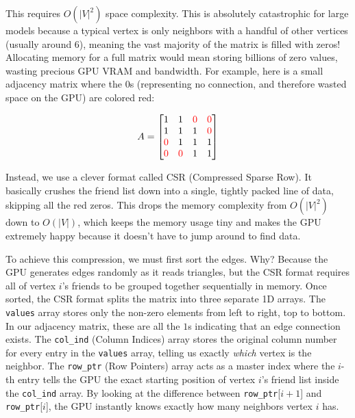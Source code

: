 This requires $O(|V|^2)$ space complexity. This is absolutely catastrophic for large models because a typical vertex is only neighbors with a handful of other vertices (usually around 6), meaning the vast majority of the matrix is filled with zeros! Allocating memory for a full matrix would mean storing billions of zero values, wasting precious GPU VRAM and bandwidth. For example, here is a small adjacency matrix where the 0s (representing no connection, and therefore wasted space on the GPU) are colored red:

\begin{equation}
\label{eq:adj_matrix}
A = \begin{bmatrix}
1 & 1 & \textcolor{red}{0} & \textcolor{red}{0} \\
1 & 1 & 1 & \textcolor{red}{0} \\
\textcolor{red}{0} & 1 & 1 & 1 \\
\textcolor{red}{0} & \textcolor{red}{0} & 1 & 1
\end{bmatrix}
\end{equation}

Instead, we use a clever format called CSR (Compressed Sparse Row). It basically crushes the friend list down into a single, tightly packed line of data, skipping all the red zeros. This drops the memory complexity from $O(|V|^2)$ down to $O(|V|)$, which keeps the memory usage tiny and makes the GPU extremely happy because it doesn't have to jump around to find data.

To achieve this compression, we must first sort the edges. Why? Because the GPU generates edges randomly as it reads triangles, but the CSR format requires all of vertex $i$'s friends to be grouped together sequentially in memory. Once sorted, the CSR format splits the matrix into three separate 1D arrays. The \texttt{values} array stores only the non-zero elements from left to right, top to bottom. In our adjacency matrix, these are all the $1$s indicating that an edge connection exists. The \texttt{col\_ind} (Column Indices) array stores the original column number for every entry in the \texttt{values} array, telling us exactly \textit{which} vertex is the neighbor. The \texttt{row\_ptr} (Row Pointers) array acts as a master index where the $i$-th entry tells the GPU the exact starting position of vertex $i$'s friend list inside the \texttt{col\_ind} array. By looking at the difference between \texttt{row\_ptr}[$i+1$] and \texttt{row\_ptr}[$i$], the GPU instantly knows exactly how many neighbors vertex $i$ has.

